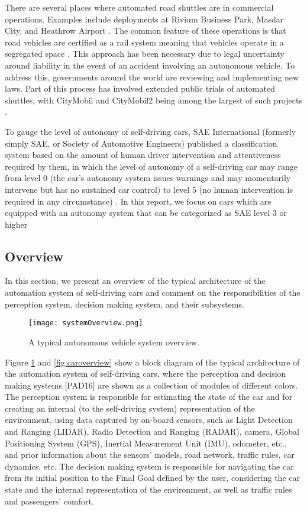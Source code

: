 There are several places where automated road shuttles are in commercial
operations. Examples include deployments at Rivium Business Park, Masdar City,
and Heathrow Airport \cite{masdar}. The common feature of these operations is
that road vehicles are certified as a rail system meaning that vehicles operate
in a segregated space \cite{masdar}. This approach has been necessary due to
legal uncertainty around liability in the event of an accident involving an
autonomous vehicle. To address this, governments around the world are reviewing
and implementing new laws. Part of this process has involved extended public
trials of automated shuttles, with CityMobil and CityMobil2 being among the
largest of such projects \cite{masdar}.

To gauge the level of autonomy of self-driving cars, SAE International (formerly
simply SAE, or Society of Automotive Engineers) published a classification
system based on the amount of human driver intervention and attentiveness
required by them, in which the level of autonomy of a self-driving car may range
from level 0 (the car’s autonomy system issues warnings and may momentarily
intervene but has no sustained car control) to level 5 (no human intervention is
required in any circumstance) \cite{sae}. In this report, we focus on cars which
are equipped with an autonomy system that can be categorized as SAE level 3 or
higher

\subsection{Overview}

In this section, we present an overview of the typical architecture of the
automation system of self-driving cars and comment on the responsibilities of
the perception system, decision making system, and their subsystems.

\begin{figure}[h]
    \centering
    \texttt{[image: systemOverview.png]}
    \caption{A typical autonomous vehicle system overview.}
    \label{fig:systemOverview}
\end{figure}

Figure \ref{fig:systemOverview} and \ref{fig:caroverview} show a block diagram
of the typical architecture of the automation system of self-driving cars, where
the perception and decision making systems [PAD16] are shown as a collection of
modules of different colors. The perception system is responsible for estimating
the state of the car and for creating an internal (to the self-driving system)
representation of the environment, using data captured by on-board sensors, such
as Light Detection and Ranging (LIDAR), Radio Detection and Ranging (RADAR),
camera, Global Positioning System (GPS), Inertial Measurement Unit (IMU),
odometer, etc., and prior information about the sensors’ models, road network,
traffic rules, car dynamics, etc. The decision making system is responsible for
navigating the car from its initial position to the Final Goal defined by the
user, considering the car state and the internal representation of the
environment, as well as traffic rules and passengers’ comfort.

